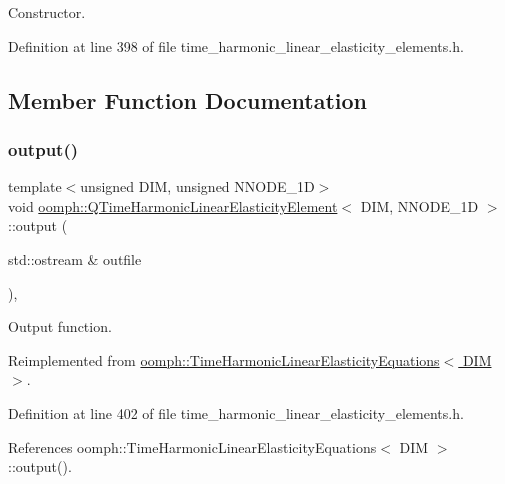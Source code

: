 Constructor. 



Definition at line 398 of file time\+\_\+harmonic\+\_\+linear\+\_\+elasticity\+\_\+elements.\+h.



\subsection{Member Function Documentation}
\mbox{\label{classoomph_1_1QTimeHarmonicLinearElasticityElement_a4d142935a8302780cbfe8fdcd26d4358}} 
\subsubsection{\texorpdfstring{output()}{output()}\hspace{0.1cm}{\footnotesize\ttfamily [1/4]}}
{\footnotesize\ttfamily template$<$unsigned D\+IM, unsigned N\+N\+O\+D\+E\+\_\+1D$>$ \\
void \hyperlink{classoomph_1_1QTimeHarmonicLinearElasticityElement}{oomph\+::\+Q\+Time\+Harmonic\+Linear\+Elasticity\+Element}$<$ D\+IM, N\+N\+O\+D\+E\+\_\+1D $>$\+::output (\begin{DoxyParamCaption}\item[{std\+::ostream \&}]{outfile }\end{DoxyParamCaption})\hspace{0.3cm}{\ttfamily [inline]}, {\ttfamily [virtual]}}



Output function. 



Reimplemented from \hyperlink{classoomph_1_1TimeHarmonicLinearElasticityEquations_acbc7549f33300563f0a3953782fb4a46}{oomph\+::\+Time\+Harmonic\+Linear\+Elasticity\+Equations$<$ D\+I\+M $>$}.



Definition at line 402 of file time\+\_\+harmonic\+\_\+linear\+\_\+elasticity\+\_\+elements.\+h.



References oomph\+::\+Time\+Harmonic\+Linear\+Elasticity\+Equations$<$ D\+I\+M $>$\+::output().

